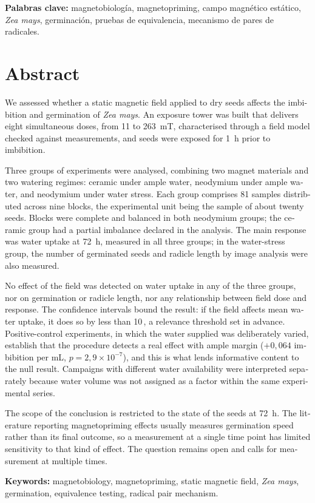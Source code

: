 \vspace{1em}
\noindent\textbf{Palabras clave:} magnetobiología, magnetopriming, campo magnético estático, \textit{Zea mays}, germinación, pruebas de equivalencia, mecanismo de pares de radicales.

\clearpage

\chapter*{Abstract}

\begin{otherlanguage}{english}

We assessed whether a static magnetic field applied to dry seeds affects the imbibition and germination of \textit{Zea mays}. An exposure tower was built that delivers eight simultaneous doses, from 11 to 263~mT, characterised through a field model checked against measurements, and seeds were exposed for 1~h prior to imbibition.

Three groups of experiments were analysed, combining two magnet materials and two watering regimes: ceramic under ample water, neodymium under ample water, and neodymium under water stress. Each group comprises 81 samples distributed across nine blocks, the experimental unit being the sample of about twenty seeds. Blocks were complete and balanced in both neodymium groups; the ceramic group had a partial imbalance declared in the analysis. The main response was water uptake at 72~h, measured in all three groups; in the water-stress group, the number of germinated seeds and radicle length by image analysis were also measured.

No effect of the field was detected on water uptake in any of the three groups, nor on germination or radicle length, nor any relationship between field dose and response. The confidence intervals bound the result: if the field affects mean water uptake, it does so by less than 10\,\pct, a relevance threshold set in advance. Positive-control experiments, in which the water supplied was deliberately varied, establish that the procedure detects a real effect with ample margin (\(+0{,}064\) imbibition per mL, \(p = 2{,}9\times10^{-7}\)), and this is what lends informative content to the null result. Campaigns with different water availability were interpreted separately because water volume was not assigned as a factor within the same experimental series.

The scope of the conclusion is restricted to the state of the seeds at 72~h. The literature reporting magnetopriming effects usually measures germination speed rather than its final outcome, so a measurement at a single time point has limited sensitivity to that kind of effect. The question remains open and calls for measurement at multiple times.

\vspace{1em}
\noindent\textbf{Keywords:} magnetobiology, magnetopriming, static magnetic field, \textit{Zea mays}, germination, equivalence testing, radical pair mechanism.

\end{otherlanguage}

\endinput
